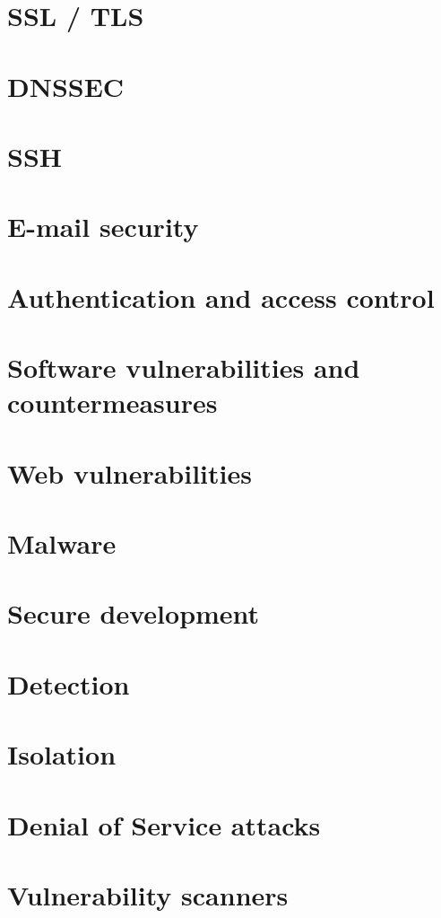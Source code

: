 \documentclass[final]{article}
\begin{document}
\section{SSL / TLS}
\section{DNSSEC}
\section{SSH}
\section{E-mail security}
\section{Authentication and access control}
\section{Software vulnerabilities and countermeasures}
\section{Web vulnerabilities}
\section{Malware}
\section{Secure development}
\section{Detection}
\section{Isolation}
\section{Denial of Service attacks}
\section{Vulnerability scanners}
\end{document}
